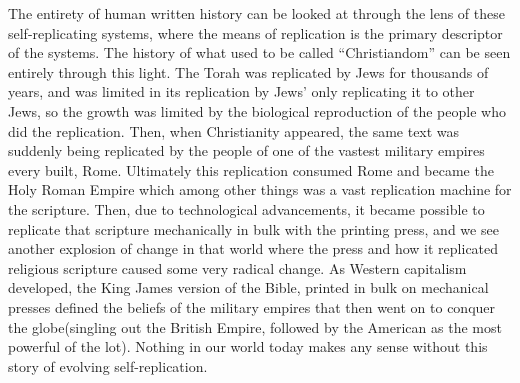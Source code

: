 \documentclass[12pt,a4paper]{amsart}
\numberwithin{equation}{section}
\begin{document}
The entirety of human written history can be looked at through the lens
of these self-replicating systems, where the means of replication is the
primary descriptor of the systems. The history of what used to be called
``Christiandom'' can be seen entirely through this light. The Torah was
replicated by Jews for thousands of years, and was limited in its
replication by Jews' only replicating it to other Jews, so the growth
was limited by the biological reproduction of the people who did the
replication. Then, when Christianity appeared, the same text was
suddenly being replicated by the people of one of the vastest military
empires every built, Rome. Ultimately this replication consumed Rome and
became the Holy Roman Empire which among other things was a vast
replication machine for the scripture. Then, due to technological
advancements, it became possible to replicate that scripture
mechanically in bulk with the printing press, and we see another
explosion of change in that world where the press and how it replicated
religious scripture caused some very radical change. As Western
capitalism developed, the King James version of the Bible, printed in
bulk on mechanical presses defined the beliefs of the military empires
that then went on to conquer the globe(singling out the British Empire,
followed by the American as the most powerful of the lot). Nothing in
our world today makes any sense without this story of evolving
self-replication.
\end{document}
